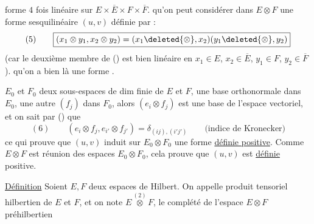 forme $4$ fois linéaire sur $E\times\overline E\times F\times\overline F$.
  qu'on peut considérer dans $E\otimes F$  une forme sesquilinéaire $(u,v)$ définie par  :
\[
(5)\qquad\boxed{(x_1\otimes y_1,x_2\otimes y_2)=(x_1\deleted{\otimes},x_2)(y_1\deleted{\otimes},y_2)}
\]
(car le deuxième membre de () est bien linéaire en $x_1\in E$, $x_2\in\overline E$, $y_1\in F$, $y_2\in\overline F$).
  qu'on a bien là une forme .

  $E_0$ et $F_0$  deux sous-espaces de dim finie de $E$ et $F$,   une base orthonormale  dans $E_0$, une autre $(f_j)$ dans $F_0$,
alors $(e_i\otimes f_j)$ est une base de l'espace vectoriel, et on sait par () que
\[
(6)\qquad(e_i\otimes f_j,e_{i'}\otimes f_{j'})=\delta_{(ij),(i'j')}\qquad\text{(indice de Kronecker)}
\]
ce qui prouve que $(u,v)$ induit sur $E_0\otimes F_0$ une forme \uline{définie positive}.
Comme $E\otimes F$ est réunion des espaces $E_0\otimes F_0$, cela prouve que $(u,v)$ est \uline{définie} positive.

\uline{Définition} Soient $E,F$ deux espaces de Hilbert. On appelle produit tensoriel hilbertien de $E$ et $F$, et on note $E\overset{(2)}{\otimes}F$, le complété de l'espace  $E\otimes F$ préhilbertien
